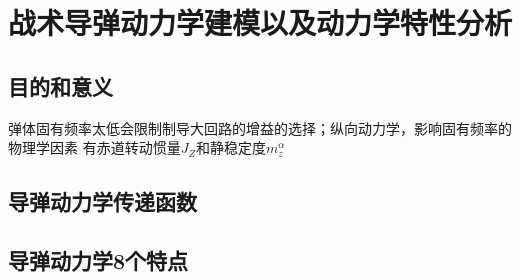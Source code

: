 \chapter{战术导弹动力学建模以及动力学特性分析}
\section{目的和意义}
弹体固有频率太低会限制制导大回路的增益的选择；纵向动力学，影响固有频率的物理学因素
有赤道转动惯量$J_Z$和静稳定度$m_z^{\alpha}$

\section{导弹动力学传递函数}
\section{导弹动力学8个特点}
